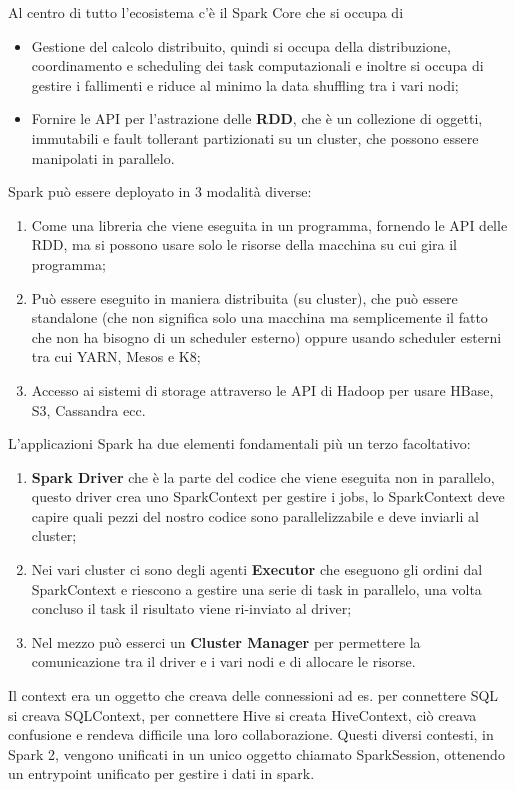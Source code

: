 \documentclass[11pt, twocolumn]{article}
\newenvironment{myitemize}
{ \begin{itemize}[topsep=0ex]
		\setlength{\itemsep}{0pt}
		\setlength{\parskip}{0pt}
		\setlength{\parsep}{0pt}     }
	{ \end{itemize}                  }
\newenvironment{myenumerate}
{ \begin{enumerate}[topsep=0ex]
		\setlength{\itemsep}{0pt}
		\setlength{\parskip}{0pt}
		\setlength{\parsep}{0pt}     }
	{ \end{enumerate}                  }
\begin{document}
Al centro di tutto l'ecosistema c'è il Spark Core che si occupa di
\begin{myitemize}
	\item Gestione del calcolo distribuito, quindi si occupa della distribuzione, coordinamento e scheduling dei task computazionali e inoltre si occupa di gestire i fallimenti e riduce al minimo la data shuffling tra i vari nodi;
	\item Fornire le API per l'astrazione delle \textbf{RDD}, che è un collezione di oggetti, immutabili e fault tollerant partizionati su un cluster, che possono essere manipolati in parallelo.
\end{myitemize}
Spark può essere deployato in 3 modalità diverse:
\begin{myenumerate}
	\item Come una libreria che viene eseguita in un programma, fornendo le API delle RDD, ma si possono usare solo le risorse della macchina su cui gira il programma;
	\item Può essere eseguito in maniera distribuita (su cluster), che può essere standalone (che non significa solo una macchina ma semplicemente il fatto che non ha bisogno di un scheduler esterno) oppure usando scheduler esterni tra cui YARN, Mesos e K8;
	\item Accesso ai sistemi di storage attraverso le API di Hadoop per usare HBase, S3, Cassandra ecc.
\end{myenumerate}
L'applicazioni Spark ha due elementi fondamentali più un terzo facoltativo:
\begin{myenumerate}
	\item \textbf{Spark Driver} che è la parte del codice che viene eseguita non in parallelo, questo driver crea uno SparkContext per gestire i jobs, lo SparkContext deve capire quali pezzi del nostro codice sono parallelizzabile e deve inviarli al cluster;
	\item Nei vari cluster ci sono degli agenti \textbf{Executor} che eseguono gli ordini dal SparkContext e riescono a gestire una serie di task in parallelo, una volta concluso il task il risultato viene ri-inviato al driver;
	\item Nel mezzo può esserci un \textbf{Cluster Manager} per permettere la comunicazione tra il driver e i vari nodi e di allocare le risorse.
\end{myenumerate}
Il context era un oggetto che creava delle connessioni ad es. per connettere SQL si creava SQLContext, per connettere Hive si creata HiveContext, ciò creava confusione e rendeva difficile una loro collaborazione. 
Questi diversi contesti, in Spark 2, vengono unificati in un unico oggetto chiamato SparkSession, ottenendo un entrypoint unificato per gestire i dati in spark.
\end{document}
